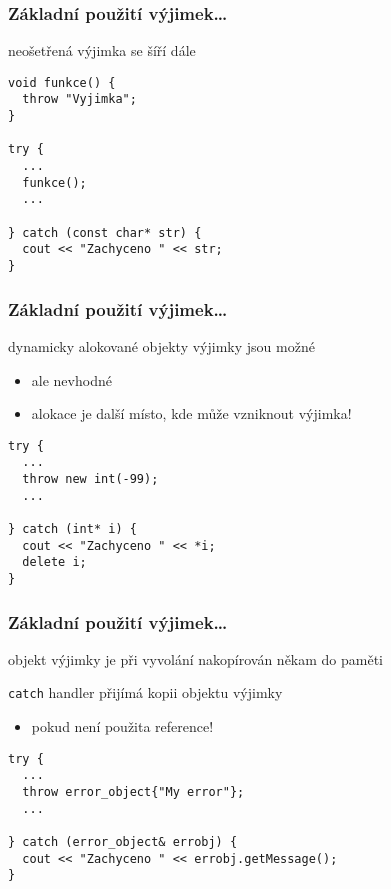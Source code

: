 \begin{frame}[fragile]
\frametitle{Základní použití výjimek\ldots}
\begin{bitemize}
\item neošetřená výjimka se šíří dále
\end{bitemize}
\begin{yesblock}
\begin{lstlisting}
void funkce() {
  throw "Vyjimka";
}

try {
  ...
  funkce();
  ...

} catch (const char* str) {
  cout << "Zachyceno " << str;
}
\end{lstlisting}
\end{yesblock}
\end{frame}



\begin{frame}[fragile]
\frametitle{Základní použití výjimek\ldots}
\begin{bitemize}
\item dynamicky alokované objekty výjimky jsou možné
\begin{itemize}
\item ale nevhodné
\item alokace je další místo, kde může vzniknout výjimka!
\end{itemize}
\end{bitemize}
\begin{yesblock}
\begin{lstlisting}[basicstyle=\small]
try {
  ...
  throw new int(-99);
  ...

} catch (int* i) {
  cout << "Zachyceno " << *i;
  delete i;
}
\end{lstlisting}
\end{yesblock}
\end{frame}




\begin{frame}[fragile]
\frametitle{Základní použití výjimek\ldots}
\begin{bitemize}
\item objekt výjimky je při vyvolání nakopírován někam do paměti
\item \lstinline|catch| handler přijímá kopii objektu výjimky
\begin{itemize}
\item pokud není použita reference!
\end{itemize}
\end{bitemize}
\begin{yesblock}
\begin{lstlisting}
try {
  ...
  throw error_object{"My error"};
  ...

} catch (error_object& errobj) {
  cout << "Zachyceno " << errobj.getMessage();
}
\end{lstlisting}
\end{yesblock}
\end{frame}




